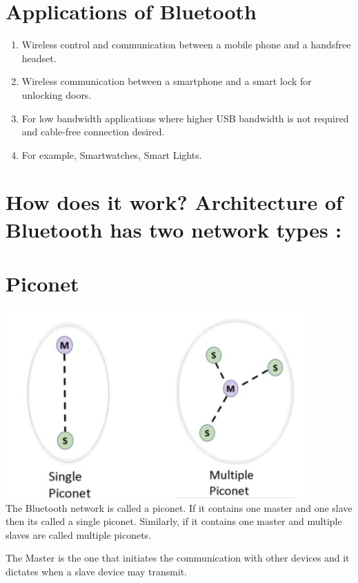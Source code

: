 \documentclass{report}
\begin{document}
\begin{multicols}{1}    
    \section*{Applications of Bluetooth}
    \begin{enumerate}
    \item Wireless control and communication between a mobile phone and a handsfree headset.
     \item Wireless communication between a smartphone and a smart lock for unlocking doors.
     \item For low bandwidth applications where higher USB bandwidth is not required and cable-free connection desired.
     \item For example, Smartwatches, Smart Lights.
    \end{enumerate}

    \section*{How does it work? 
     Architecture of Bluetooth has two network types :}
    \section*{Piconet}

    \includegraphics{Piconet}\\
  
    
    The Bluetooth network is called a piconet. If it contains one master and one slave then its called a single piconet. Similarly, if it contains one master and multiple slaves are called multiple piconets.
    

    The Master is the one that initiates the communication with other devices and it dictates when a slave device may transmit.
    

\end{multicols}
\end{document}
